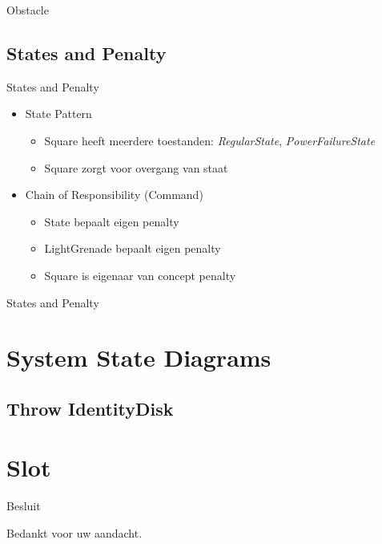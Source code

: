 \documentclass[t]{beamer}
\begin{document}
\begin{frame}{Obstacle}
\begin{center}
\end{center}
\end{frame}

\subsection{States and Penalty}

\begin{frame}{States and Penalty}
\begin{itemize}
	\item State Pattern
	\begin{itemize}
		\item Square heeft meerdere toestanden: \textit{RegularState}, \textit{PowerFailureState}
		\item Square zorgt voor overgang van staat
	\end{itemize}
	\item Chain of Responsibility (Command)
	\begin{itemize}
		\item State bepaalt eigen penalty
		\item LightGrenade bepaalt eigen penalty
		\item Square is eigenaar van concept penalty
	\end{itemize}
\end{itemize}
\end{frame}

\begin{frame}{States and Penalty}
\begin{center}
\end{center}
\end{frame}


\section{System State Diagrams}

\subsection{Throw IdentityDisk}
\begin{frame}
\begin{center}

\end{center}
\end{frame}


\section{Slot}
\begin{frame}{Besluit}
\vspace{0.8in}
\begin{center}
Bedankt voor uw aandacht.
\end{center}
\end{frame}
\end{document}
